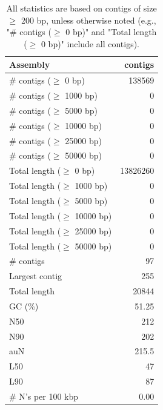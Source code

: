\documentclass[12pt,a4paper]{article}
\begin{document}
\begin{table}[ht]
\begin{center}
\caption{All statistics are based on contigs of size $\geq$ 200 bp, unless otherwise noted (e.g., "\# contigs ($\geq$ 0 bp)" and "Total length ($\geq$ 0 bp)" include all contigs).}
\begin{tabular}{|l*{1}{|r}|}
\hline
Assembly & contigs \\ \hline
\# contigs ($\geq$ 0 bp) & 138569 \\ \hline
\# contigs ($\geq$ 1000 bp) & 0 \\ \hline
\# contigs ($\geq$ 5000 bp) & 0 \\ \hline
\# contigs ($\geq$ 10000 bp) & 0 \\ \hline
\# contigs ($\geq$ 25000 bp) & 0 \\ \hline
\# contigs ($\geq$ 50000 bp) & 0 \\ \hline
Total length ($\geq$ 0 bp) & 13826260 \\ \hline
Total length ($\geq$ 1000 bp) & 0 \\ \hline
Total length ($\geq$ 5000 bp) & 0 \\ \hline
Total length ($\geq$ 10000 bp) & 0 \\ \hline
Total length ($\geq$ 25000 bp) & 0 \\ \hline
Total length ($\geq$ 50000 bp) & 0 \\ \hline
\# contigs & 97 \\ \hline
Largest contig & 255 \\ \hline
Total length & 20844 \\ \hline
GC (\%) & 51.25 \\ \hline
N50 & 212 \\ \hline
N90 & 202 \\ \hline
auN & 215.5 \\ \hline
L50 & 47 \\ \hline
L90 & 87 \\ \hline
\# N's per 100 kbp & 0.00 \\ \hline
\end{tabular}
\end{center}
\end{table}
\end{document}
